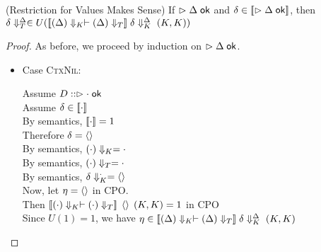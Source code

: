 \begin{lemma}{(Restriction for Values Makes Sense)}
\label{value-restriction}
If $\vartriangleright {\Delta} \;\mathsf{ok}$ and $\delta \in [\![{\vartriangleright {\Delta} \;\mathsf{ok}}]\!]$, 
then ${\delta}\Downarrow^{\Delta}_T \in U([\![{({\Delta})\Downarrow_K \vdash ({\Delta})\Downarrow_T}]\!]\;
            {\delta}\Downarrow^{\Delta}_K\;(K,K))$
\end{lemma}

\begin{proof}
As before, we proceed by induction on $\vartriangleright {\Delta} \;\mathsf{ok}$. 
\begin{itemize}
\item Case \textsc{CtxNil}: 
  \begin{tabbedproof}
    \oo Assume $D :: \vartriangleright {\cdot} \;\mathsf{ok}$ \\
    \oo Assume $\delta \in [\![{\cdot}]\!]$ \\
    \ooo By semantics, $[\![{\cdot}]\!] = 1$ \\
    \ooo Therefore $\delta = \left<\right>$ \\
    \ooo By semantics, $({\cdot})\Downarrow_K = \cdot$ \\
    \ooo By semantics, $({\cdot})\Downarrow_T = \cdot$ \\
    \ooo By semantics, ${\delta}\Downarrow^{\cdot}_K = \left<\right>$ \\
    \ooo Now, let $\eta = \left<\right>$ in CPO. \\
    \ooo Then $[\![{({\cdot})\Downarrow_K \vdash ({\cdot})\Downarrow_T}]\!]\;\left<\right>\;(K,K) = 1$ in CPO \\
    \ooo Since $U(1) = 1$, we have $\eta \in [\![{({\Delta})\Downarrow_K \vdash ({\Delta})\Downarrow_T}]\!]\;
            {\delta}\Downarrow^{\Delta}_K\;
            (K,K)$ \\
  \end{tabbedproof}


\end{itemize}
\end{proof}
